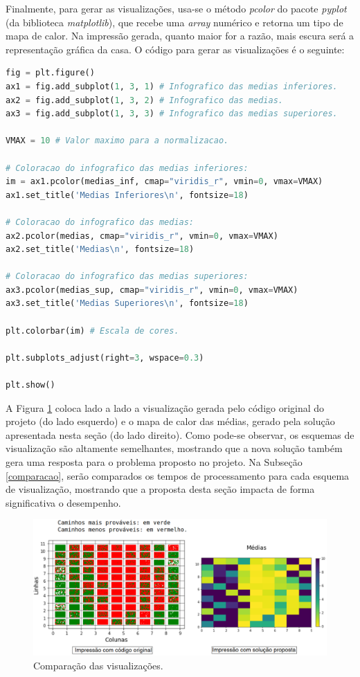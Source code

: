 \documentclass[12pt]{article}
\begin{document}
Finalmente, para gerar as visualizações, usa-se o método \textit{pcolor} do pacote \textit{pyplot} (da biblioteca \textit{matplotlib}), que recebe uma \textit{array} numérico e retorna um tipo de mapa de calor. Na impressão gerada, quanto maior for a razão, mais escura será a representação gráfica da casa. O código para gerar as visualizações é o seguinte:

\begin{lstlisting}[language=Python]
fig = plt.figure()
ax1 = fig.add_subplot(1, 3, 1) # Infografico das medias inferiores.
ax2 = fig.add_subplot(1, 3, 2) # Infografico das medias.
ax3 = fig.add_subplot(1, 3, 3) # Infografico das medias superiores.

VMAX = 10 # Valor maximo para a normalizacao.

# Coloracao do infografico das medias inferiores:
im = ax1.pcolor(medias_inf, cmap="viridis_r", vmin=0, vmax=VMAX)
ax1.set_title('Medias Inferiores\n', fontsize=18)

# Coloracao do infografico das medias:
ax2.pcolor(medias, cmap="viridis_r", vmin=0, vmax=VMAX)
ax2.set_title('Medias\n', fontsize=18)

# Coloracao do infografico das medias superiores:
ax3.pcolor(medias_sup, cmap="viridis_r", vmin=0, vmax=VMAX)
ax3.set_title('Medias Superiores\n', fontsize=18)

plt.colorbar(im) # Escala de cores.

plt.subplots_adjust(right=3, wspace=0.3)

plt.show()
\end{lstlisting}

A Figura \ref{comparacao_visualizacao} coloca lado a lado a visualização gerada pelo código original do projeto (do lado esquerdo) e o mapa de calor das médias, gerado pela solução apresentada nesta seção (do lado direito). Como pode-se observar, os esquemas de visualização são altamente semelhantes, mostrando que a nova solução também gera uma resposta para o problema proposto no projeto. Na Subseção \ref{comparacao}, serão comparados os tempos de processamento para cada esquema de visualização, mostrando que a proposta desta seção impacta de forma significativa o desempenho.

\begin{figure}[ht!]
	\centering
	\includegraphics[width=1\linewidth]{img/comparacao_visualizacao.png}
	\caption{Comparação das visualizações.}
	\label{comparacao_visualizacao}
\end{figure}
\end{document}

